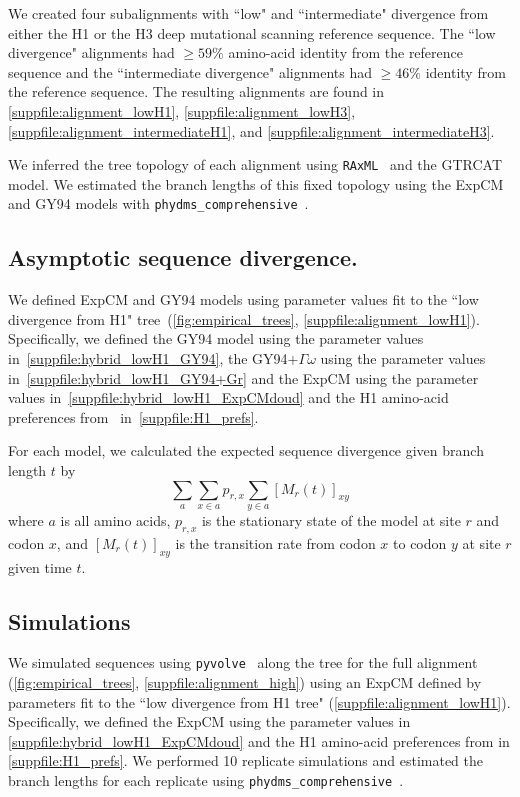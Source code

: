 \documentclass[11pt]{article}
\begin{document}
We created four subalignments with ``low" and ``intermediate" divergence from either the H1 or the H3 deep mutational scanning reference sequence. 
The ``low divergence" alignments had   $\ge 59\%$ amino-acid identity from the reference sequence and the ``intermediate divergence" alignments had $\ge 46\%$ identity from the reference sequence.
The resulting alignments are found in \ref{suppfile:alignment_lowH1}, \ref{suppfile:alignment_lowH3}, \ref{suppfile:alignment_intermediateH1}, and \ref{suppfile:alignment_intermediateH3}.  

We inferred the tree topology of each alignment using \texttt{RAxML}~\citep{stamatakis2006raxml} and the GTRCAT model. 
We estimated the branch lengths of this fixed topology using the ExpCM and GY94 models with \texttt{phydms\_comprehensive}~\citep{hilton2017phydms}. 

\subsection*{Asymptotic sequence divergence.}

We defined ExpCM and GY94 models using parameter values fit to the ``low divergence from H1" tree~(\ref{fig:empirical_trees}, \ref{suppfile:alignment_lowH1}). 
Specifically, we defined the GY94 model using the parameter values in~\ref{suppfile:hybrid_lowH1_GY94}, the GY94+$\Gamma\omega$ using the parameter values in~\ref{suppfile:hybrid_lowH1_GY94+Gr} and the ExpCM using the parameter values in~\ref{suppfile:hybrid_lowH1_ExpCMdoud} and the H1 amino-acid preferences from~\citet{doud2016accurate} in~\ref{suppfile:H1_prefs}. 

For each model, we calculated the expected sequence divergence given branch length $t$ by 
\begin{equation}
\label{eq:f}
\sum_a \sum_{x \in a} p_{r,x} \sum_{y \in a} [M_{r}\left(t\right)]_{xy}
\end{equation}
where $a$ is all amino acids, $p_{r,x}$ is the stationary state of the model at site $r$ and codon $x$, and $[M_{r}\left(t\right)]_{xy}$ is the transition rate from codon $x$ to codon $y$ at site $r$ given time $t$. 

\subsection*{Simulations}

We simulated sequences using \texttt{pyvolve}~\citep{spielman2015pyvolve} along the tree for the full alignment (\ref{fig:empirical_trees}, \ref{suppfile:alignment_high}) using an ExpCM defined by parameters fit to the ``low divergence from H1 tree" (\ref{suppfile:alignment_lowH1}). 
Specifically, we defined the ExpCM using the parameter values in \ref{suppfile:hybrid_lowH1_ExpCMdoud} and the H1 amino-acid preferences from \citet{doud2016accurate} in \ref{suppfile:H1_prefs}. 
We performed 10 replicate simulations and estimated the branch lengths for each replicate using \texttt{phydms\_comprehensive}~\citep{hilton2017phydms}. 
\end{document}
